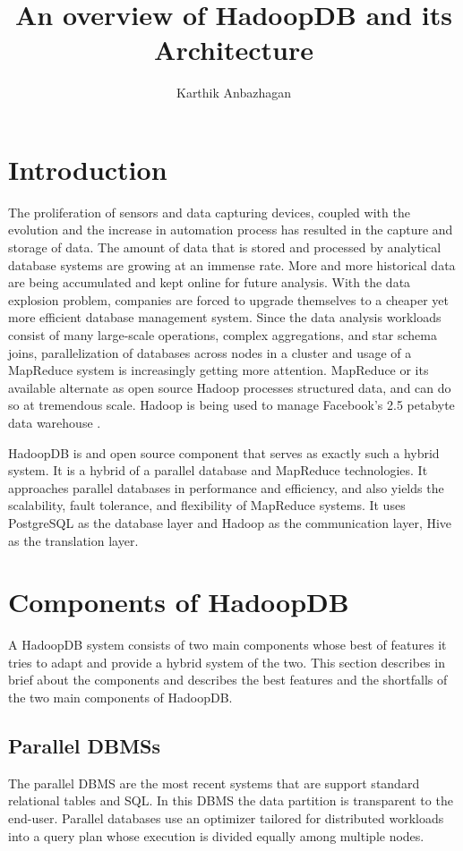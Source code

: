 \documentclass[9pt,twocolumn,twoside]{../../styles/osajnl}
\title{An overview of HadoopDB and its Architecture}
\author[1]{Karthik Anbazhagan}
\affil[1]{School of Informatics and Computing, Bloomington, IN 47408, U.S.A.}
\affil[*]{Corresponding authors: kartanba@iu.edu}
\begin{document}
\maketitle 


\section{Introduction}
The proliferation of sensors and data capturing devices, coupled with the evolution and the increase in automation process has resulted in the capture and storage of data. The amount of data that is stored and processed by analytical database systems are growing at an immense rate. More and more historical data are being accumulated and kept online for future analysis. With the data explosion problem, companies are forced to upgrade themselves to a cheaper yet more efficient database management system. Since the data analysis workloads consist of many large-scale operations, complex aggregations, and star schema joins, parallelization of databases across nodes in a cluster and usage of a MapReduce system is increasingly getting more attention. MapReduce or its available alternate as open source Hadoop processes structured data, and can do so at tremendous scale. Hadoop is being used to manage Facebook’s 2.5 petabyte data warehouse \cite{fb-hadoop}. 

HadoopDB\cite{hadoopdb} is and open source component that serves as exactly such a hybrid system. It is a hybrid of a parallel database and MapReduce technologies. It approaches parallel databases in performance and efficiency, and also yields the scalability, fault tolerance, and flexibility of MapReduce systems. It uses PostgreSQL as the database layer and Hadoop as the communication layer, Hive as the translation layer.

\section{Components of HadoopDB}
A HadoopDB \cite{hadoopdb-project} system consists of two main components whose best of features it tries to adapt and provide a hybrid system of the two. This section describes in brief about the components and describes the best features and the shortfalls of the two main components of HadoopDB.

\subsection{Parallel DBMSs}
The parallel DBMS are the most recent systems that are support standard relational tables and SQL. In this DBMS the data partition is transparent to the end-user. Parallel databases use an optimizer tailored for distributed workloads into a query plan whose execution is divided equally among multiple nodes.
 
\end{document}
